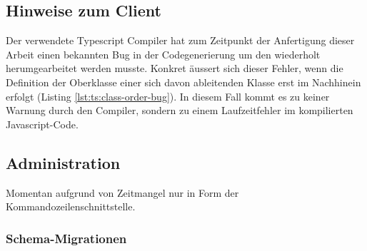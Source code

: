 \subsection{Hinweise zum Client}

Der verwendete Typescript Compiler hat zum Zeitpunkt der Anfertigung dieser Arbeit einen bekannten Bug in der Codegenerierung \cite{ts-compiler-class-order-bug} um den wiederholt herumgearbeitet werden musste. Konkret äussert sich dieser Fehler, wenn die Definition der Oberklasse einer sich davon ableitenden Klasse erst im Nachhinein erfolgt (Listing \ref{lst:ts:class-order-bug}). In diesem Fall kommt es zu keiner Warnung durch den Compiler, sondern zu einem Laufzeitfehler im kompilierten Javascript-Code.



\subsection{Administration}
\label{sec:implementation-administration}

Momentan aufgrund von Zeitmangel nur in Form der Kommandozeilenschnittstelle.

\subsubsection{Schema-Migrationen}
\label{sec:implementation-migration}

